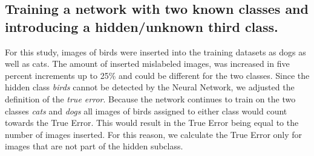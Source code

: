 \documentclass[a4paper,11pt]{scrartcl}
\theoremstyle{definition}
\begin{document}
\subsection[Two labels, introduction of an unknown third class]{Training a network with two known classes and introducing a hidden/unknown third class.}
For this study, images of birds were inserted into the training datasets as dogs as well as cats.
The amount of inserted mislabeled images, was increased in five percent increments up to 25\% and could be different for the two classes.
Since the hidden class \emph{birds} cannot be detected by the Neural Network, we adjusted the definition of the \emph{true error}.
Because the network continues to train on the two classes \emph{cats} and \emph{dogs} all images of birds assigned to either class would count towards the True Error.
This would result in the True Error being equal to the number of images inserted.
For this reason, we calculate the True Error only for images that are not part of the hidden subclass.\textbf{}
\end{document}
